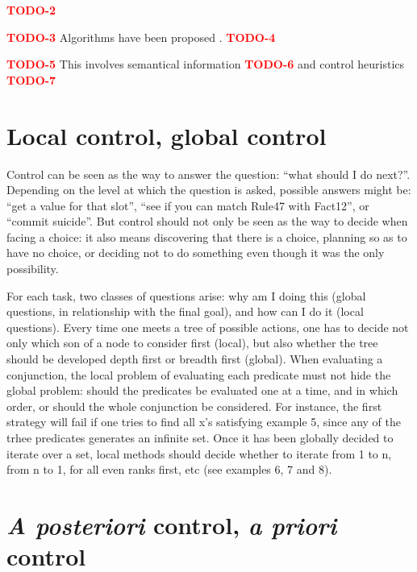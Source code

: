 \documentclass[11pt,a4paper,svgnames]{article}
\begin{document}
  {\textcolor{red}{\textbf{TODO-2}}}

  {\textcolor{red}{\textbf{TODO-3}}}
  Algorithms have been proposed \cite{Forgy-Rete-1982}.
  {\textcolor{red}{\textbf{TODO-4}}}


  {\textcolor{red}{\textbf{TODO-5}}}
  This involves semantical information
  {\textcolor{red}{\textbf{TODO-6}}}
  and control heuristics \cite{Lenat-Heuristics-1982,Lenat-Eurisko-1983}
  {\textcolor{red}{\textbf{TODO-7}}}

  \section{Local control, global control}
  \label{sec:loc-glob-control}

  Control can be seen as the way to answer the question: ``what should I do
  next?''. Depending on the level at which the question is asked, possible
  answers might be: ``get a value for that slot'', ``see if you can match
  Rule47 with Fact12'', or ``commit suicide''. But control should not only be
  seen as the way to decide when facing a choice: it also means discovering that
  there is a choice, planning so as to have no choice, or deciding not to do
  something even though it was the only possibility.

  For each task, two classes of questions arise: why am I doing this (global
  questions, in relationship with the final goal), and how can I do it (local
  questions). Every time one meets a tree of possible actions, one has to decide
  not only which son of a node to consider first (local), but also whether the
  tree should be developed depth first or breadth first (global). When evaluating
  a conjunction, the local problem of evaluating each predicate must not hide the
  global problem: should the predicates be evaluated one at a time, and in which
  order, or should the whole conjunction be considered. For instance, the first
  strategy will fail if one tries to find all x's satisfying example 5, since any
  of the trhee predicates generates an infinite set. Once it has been globally
  decided to iterate over a set, local methods should decide whether to iterate
  from 1 to n, from n to 1, for all even ranks first, etc (see examples 6, 7 and
  8).

  \section{\textit{A posteriori} control, \textit{a priori} control}
  \label{sec:posteriori-priori-control}
\end{document}

